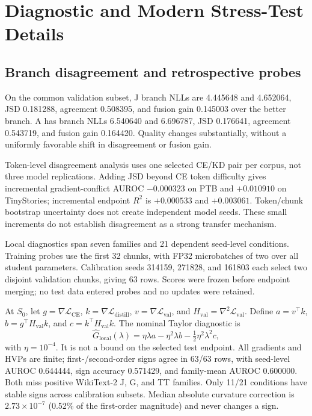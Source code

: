 \section{Diagnostic and Modern Stress-Test Details}\label{app:diagnostics-modern}

\subsection{Branch disagreement and retrospective probes}
On the common validation subset, J branch NLLs are 4.445648 and 4.652064, JSD 0.181288, agreement 0.508395, and fusion gain 0.145003 over the better branch. A has branch NLLs 6.540640 and 6.696787, JSD 0.176641, agreement 0.543719, and fusion gain 0.164420. Quality changes substantially, without a uniformly favorable shift in disagreement or fusion gain.

Token-level disagreement analysis uses one selected CE/KD pair per corpus, not three model replications. Adding JSD beyond CE token difficulty gives incremental gradient-conflict AUROC $-0.000323$ on PTB and $+0.010910$ on TinyStories; incremental endpoint $R^2$ is $+0.000533$ and $+0.003061$. Token/chunk bootstrap uncertainty does not create independent model seeds. These small increments do not establish disagreement as a strong transfer mechanism.

Local diagnostics span seven families and 21 dependent seed-level conditions. Training probes use the first 32 chunks, with FP32 microbatches of two over all student parameters. Calibration seeds 314159, 271828, and 161803 each select two disjoint validation chunks, giving 63 rows. Scores were frozen before endpoint merging; no test data entered probes and no updates were retained.

At $S_0$, let $g=\nabla\mathcal L_{\mathrm{CE}}$, $k=\nabla\mathcal L_{\mathrm{distill}}$, $v=\nabla\mathcal L_{\mathrm{val}}$, and $H_{\mathrm{val}}=\nabla^2\mathcal L_{\mathrm{val}}$. Define $a=v^\top k$, $b=g^\top H_{\mathrm{val}}k$, and $c=k^\top H_{\mathrm{val}}k$. The nominal Taylor diagnostic is
\begin{equation}
\widehat G_{\mathrm{local}}(\lambda)=\eta\lambda a-\eta^2\lambda b-\tfrac12\eta^2\lambda^2c,
\end{equation}
with $\eta=10^{-4}$. It is not a bound on the selected test endpoint. All gradients and HVPs are finite; first-/second-order signs agree in 63/63 rows, with seed-level AUROC 0.644444, sign accuracy 0.571429, and family-mean AUROC 0.600000. Both miss positive WikiText-2 J, G, and TT families. Only 11/21 conditions have stable signs across calibration subsets. Median absolute curvature correction is $2.73\times10^{-7}$ (0.52\% of the first-order magnitude) and never changes a sign.

